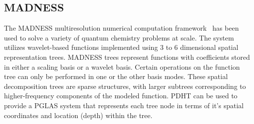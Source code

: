 




%
%
%
%


\subsection{MADNESS}

The MADNESS multiresolution numerical computation framework~\cite{thornton09}
has been used to solve a variety of quantum chemistry problems at scale. The
system utilizes wavelet-based functions implemented using 3 to 6 dimensional
spatial representation trees. MADNESS trees represent functions with
coefficients stored in either a scaling basis or a wavelet basis. Certain
operations on the function tree can only be performed in one or the other basis
modes. These spatial decomposition trees are sparse structures, with larger
subtrees corresponding to higher-frequency components of the modeled function.
PDHT can be used to provide a PGLAS system that represents each tree node in
terms of it's spatial coordinates and location (depth) within the tree.

